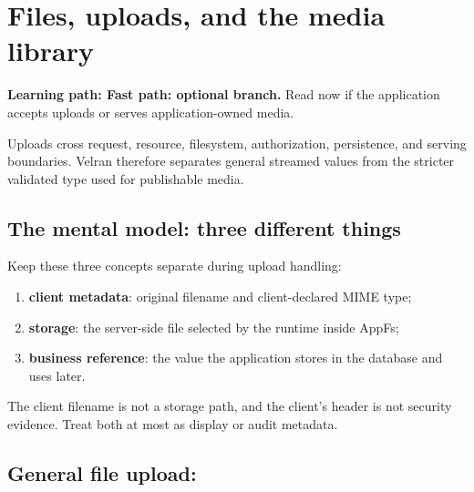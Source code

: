 \chapter{Files, uploads, and the media library}

\noindent\textbf{Learning path: Fast path: optional branch.} Read now if the application accepts uploads or serves application-owned media.\par\medskip



Uploads cross request, resource, filesystem, authorization, persistence, and serving boundaries. Velran therefore separates general streamed  values from the stricter validated  type used for publishable media.

\section{The mental model: three different things}

Keep these three concepts separate during upload handling:

\begin{enumerate}
  \item \textbf{client metadata}: original filename and client-declared MIME type;
  \item \textbf{storage}: the server-side file selected by the runtime inside AppFs;
  \item \textbf{business reference}: the value the application stores in the database and uses later.
\end{enumerate}

The client filename is not a storage path, and the client's  header is not security evidence. Treat both at most as display or audit metadata.

\section{General file upload: }

